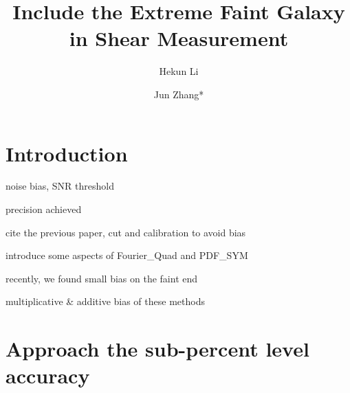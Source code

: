 \documentclass[twocolumn]{aastex62}
\begin{document}
\title{Include the Extreme Faint Galaxy in Shear Measurement}



\author{Hekun Li}
\author{Jun Zhang*}


\begin{abstract}



\end{abstract}




\section{Introduction} \label{sec:intro}
noise bias, SNR threshold

precision achieved

cite the previous paper, cut and calibration to avoid bias

introduce some aspects of Fourier\_Quad and PDF\_SYM

recently, we found small bias on the faint end

multiplicative \& additive bias of these methods
\section{Approach the sub-percent level accuracy}
\end{document}
